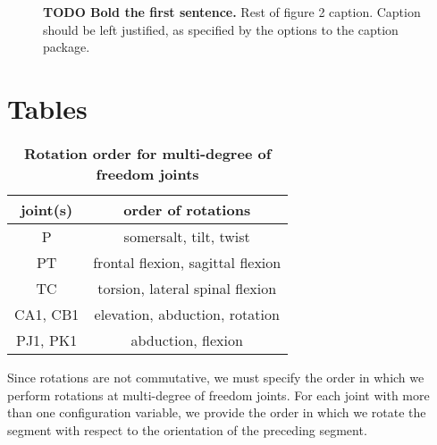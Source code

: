 \documentclass[10pt]{article}
\begin{document}
\begin{figure}[!ht]
\begin{center}
\end{center}
\caption{
{\bf TODO Bold the first sentence.}  Rest of figure 2  caption.  Caption 
should be left justified, as specified by the options to the caption 
package.
}
\label{fig:femaledefault}
\end{figure}

\section*{Tables}

\begin{table}[!ht]
\caption{
\bf{Rotation order for multi-degree of freedom joints}}
\begin{tabular}{|c|c|}
    \hline
    \textbf{joint(s)} & \textbf{order of rotations}\\
    \hline
    P & somersalt, tilt, twist \\
    \hline
    PT & frontal flexion, sagittal flexion \\
    \hline
    TC & torsion, lateral spinal flexion \\
    \hline
    CA1, CB1 & elevation, abduction, rotation \\
    \hline
    PJ1, PK1 & abduction, flexion \\
    \hline
\end{tabular}
\begin{flushleft}Since rotations are not commutative, we must specify the order
    in which we perform rotations at multi-degree of freedom joints. For each
    joint with more than one configuration variable, we provide the order in
    which we rotate the segment with respect to the orientation of the
    preceding segment.
\end{flushleft}
\label{tab:dof}
 \end{table}
\end{document}
